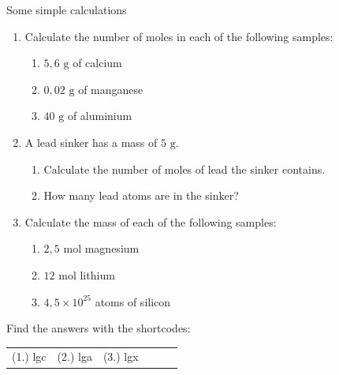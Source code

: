             \begin{exercises} {Some simple calculations}
            \nopagebreak \noindent
      \label{m38717*id278090}\begin{enumerate}[noitemsep, label=\textbf{\arabic*}. ] 
            \label{m38717*uid24}\item Calculate the number of moles in each of the following samples:
\label{m38717*id278106}\begin{enumerate}[noitemsep, label=\textbf{\alph*}. ] 
            \label{m38717*uid25}\item $5,6 \text{ g}$ of calcium
\label{m38717*uid26}\item $0,02 \text{ g}$ of manganese
\label{m38717*uid27}\item $40\text{ g}$ of aluminium
\end{enumerate}
               \label{m38717*uid28}\item A lead sinker has a mass of $5 \text{ g}$.
\label{m38717*id278159}\begin{enumerate}[noitemsep, label=\textbf{\alph*}. ] 
            \label{m38717*uid29}\item Calculate the number of moles of lead the sinker contains.
\label{m38717*uid30}\item How many lead atoms are in the sinker?
\end{enumerate}
                \label{m38717*uid31}\item Calculate the mass of each of the following samples:
\label{m38717*id278201}\begin{enumerate}[noitemsep, label=\textbf{\alph*}. ] 
            \label{m38717*uid32}\item $2,5\text{ mol}$ magnesium
\label{m38717*uid33}\item $12 \text{ mol}$ lithium
\label{m38717*uid34}\item $4,5 \times 10^{25}$ atoms of silicon
\end{enumerate}
                \end{enumerate}
\practiceinfo
\par {} Find the answers with the shortcodes:
 \par \begin{tabular}[h]{cccccc}
 (1.) lgc  &  (2.) lga  &  (3.) lgx  & \end{tabular}
\end{exercises}
